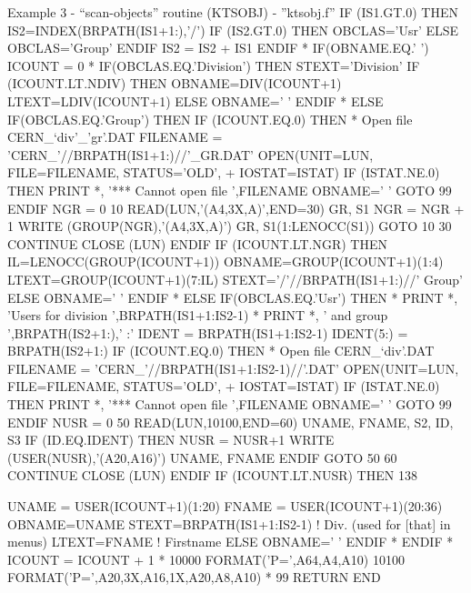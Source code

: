 \begin{XMPt} {Example 3 - ``scan-objects'' routine (KTSOBJ) -
''ktsobj.f''}
      IF (IS1.GT.0) THEN
          IS2=INDEX(BRPATH(IS1+1:),'/')
          IF (IS2.GT.0) THEN
              OBCLAS='Usr'
          ELSE
              OBCLAS='Group'
          ENDIF
          IS2 = IS2 + IS1
      ENDIF
*
      IF(OBNAME.EQ.' ') ICOUNT = 0
*
      IF(OBCLAS.EQ.'Division') THEN
         STEXT='Division'
         IF (ICOUNT.LT.NDIV) THEN
            OBNAME=DIV(ICOUNT+1)
            LTEXT=LDIV(ICOUNT+1)
         ELSE
            OBNAME=' '
         ENDIF
*
      ELSE IF(OBCLAS.EQ.'Group') THEN
         IF (ICOUNT.EQ.0) THEN
*            Open file CERN_`div'_'gr'.DAT
             FILENAME = 'CERN_'//BRPATH(IS1+1:)//'_GR.DAT'
             OPEN(UNIT=LUN, FILE=FILENAME, STATUS='OLD', 
     +            IOSTAT=ISTAT)
             IF (ISTAT.NE.0) THEN
                 PRINT *, '*** Cannot open file ',FILENAME
                 OBNAME=' '
                 GOTO 99
             ENDIF
             NGR = 0
   10        READ(LUN,'(A4,3X,A)',END=30) GR, S1
             NGR = NGR + 1
             WRITE (GROUP(NGR),'(A4,3X,A)') GR, S1(1:LENOCC(S1))
             GOTO 10
   30        CONTINUE
             CLOSE (LUN)
         ENDIF\vspace{7pt}
         IF (ICOUNT.LT.NGR) THEN
            IL=LENOCC(GROUP(ICOUNT+1))
            OBNAME=GROUP(ICOUNT+1)(1:4)
            LTEXT=GROUP(ICOUNT+1)(7:IL)
            STEXT='/'//BRPATH(IS1+1:)//' Group'
         ELSE
            OBNAME=' '
         ENDIF
*
      ELSE IF(OBCLAS.EQ.'Usr') THEN
*        PRINT *, 'Users for division ',BRPATH(IS1+1:IS2-1)
*        PRINT *, '      and group    ',BRPATH(IS2+1:),' :'
         IDENT = BRPATH(IS1+1:IS2-1)
         IDENT(5:) = BRPATH(IS2+1:)
         IF (ICOUNT.EQ.0) THEN
*            Open file CERN_`div'.DAT
             FILENAME = 'CERN_'//BRPATH(IS1+1:IS2-1)//'.DAT'
             OPEN(UNIT=LUN, FILE=FILENAME, STATUS='OLD',
     +            IOSTAT=ISTAT)
             IF (ISTAT.NE.0) THEN
                 PRINT *, '*** Cannot open file ',FILENAME
                 OBNAME=' '
                 GOTO 99
             ENDIF
             NUSR = 0
   50        READ(LUN,10100,END=60) UNAME, FNAME, S2, ID, S3
             IF (ID.EQ.IDENT) THEN
                 NUSR = NUSR+1
                 WRITE (USER(NUSR),'(A20,A16)') UNAME, FNAME
             ENDIF
             GOTO 50
   60        CONTINUE
             CLOSE (LUN)
         ENDIF
         IF (ICOUNT.LT.NUSR) THEN 138 

            UNAME = USER(ICOUNT+1)(1:20)
            FNAME = USER(ICOUNT+1)(20:36)
            OBNAME=UNAME
            STEXT=BRPATH(IS1+1:IS2-1)  ! Div. (used for [that] in menus)
            LTEXT=FNAME                ! Firstname
         ELSE
            OBNAME=' '
         ENDIF
*
      ENDIF
*
      ICOUNT = ICOUNT + 1
*
10000 FORMAT('P=',A64,A4,A10)
10100 FORMAT('P=',A20,3X,A16,1X,A20,A8,A10)
*
   99 RETURN
      END
\end{XMPt}

